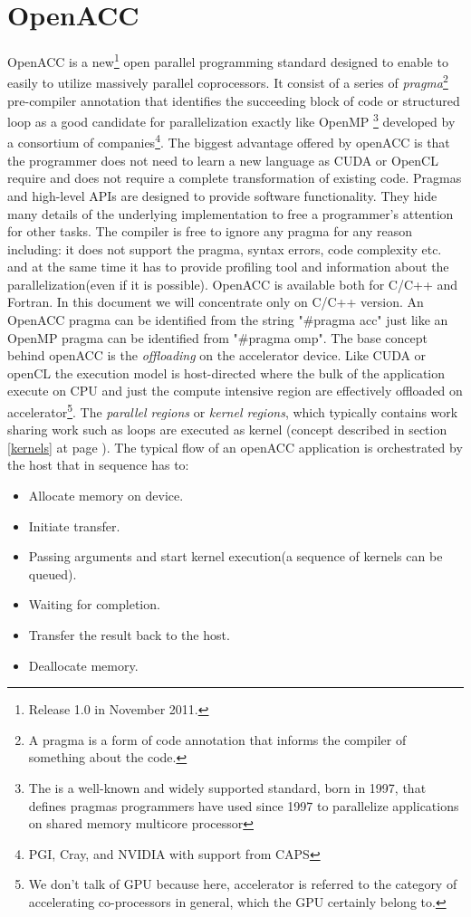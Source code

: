 \section{OpenACC}
OpenACC is a new\footnote{Release 1.0 in November 2011.} open parallel
programming standard designed to enable to easily to utilize massively parallel coprocessors. It consist of a series of
\emph{pragma}\footnote{ A pragma is a form of code annotation that informs the
compiler of something about the code.} pre-compiler annotation that
identifies the succeeding block of code  or structured loop as a good candidate
for parallelization exactly like  OpenMP \footnote{The is a well-known and widely
supported standard, born in 1997, that defines pragmas programmers
have used since 1997 to parallelize applications on shared memory multicore
processor} developed by a consortium of companies\footnote{PGI, Cray, and NVIDIA
with support from CAPS}.
The biggest advantage offered by openACC is that the programmer does not need to
learn a new language as CUDA or OpenCL require and does not require a
complete transformation of existing code.
Pragmas and high-level APIs are designed to provide software functionality. They
hide many details of the underlying implementation to free a programmer's attention for other tasks.
The compiler is free to ignore any pragma for any reason including:  it does not
support the pragma, syntax errors, code complexity etc. and at the same time it
has to provide profiling tool and information about the parallelization(even if
it is possible).
OpenACC is available both for C/C++ and Fortran. In this document we will
concentrate only on C/C++ version.
An OpenACC pragma can be identified from the string "\#pragma acc" just
like an OpenMP pragma can be identified from "\#pragma omp". The base concept
behind openACC is the \emph{offloading} on the accelerator device.
Like CUDA or openCL the execution model is host-directed where the bulk of the
application execute on CPU and just the compute intensive region are effectively
offloaded on accelerator\footnote{We don't talk of GPU because here,
accelerator is referred to the category of accelerating co-processors in
general, which the GPU certainly belong to.}.
The \emph{parallel regions } or \emph{kernel regions}, which typically contains
work sharing work such as loops are executed as kernel (concept described in
section \ref{kernels} at page \pageref{kernels}).
The typical flow of an openACC application is orchestrated by the host that in
sequence has to:
\begin{itemize}
  \item Allocate memory on device.
  \item Initiate transfer.
  \item Passing arguments and start kernel execution(a sequence of kernels can
  be queued).
  \item Waiting for completion.
  \item Transfer the result back to the host.
  \item Deallocate memory.
\end{itemize}

